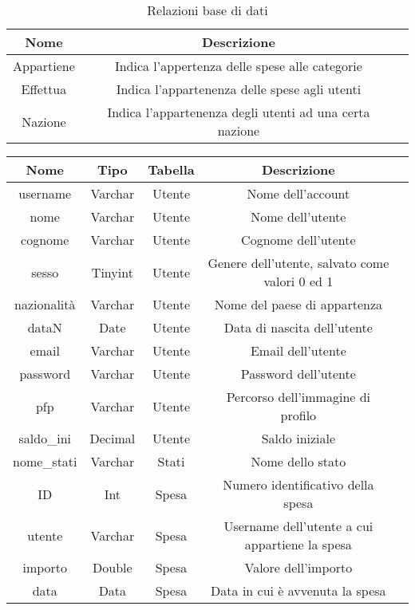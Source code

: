 \documentclass[binding=0.6cm, oneside, noexaminfo, italian]{sapthesis}
\begin{document}
\begin{table}[h]
    \centering
    \begin{tabularx}{\linewidth}{ccX}
        \toprule
        Nome & Descrizione \\
        \midrule
        Appartiene & Indica l'appertenza delle spese alle categorie\\
        Effettua & Indica l'appartenenza delle spese agli utenti\\
        Nazione & Indica l'appartenenza degli utenti ad una certa nazione \\
        \bottomrule
    \end{tabularx}
    \caption{Relazioni base di dati}
    \label{tab:relazioni}
\end{table}
\begin{table}[!ht]
    \centering
    \begin{tabularx}{\linewidth}{ccccX}
        \toprule
        Nome & Tipo & Tabella & Descrizione \\
        \midrule
        username & Varchar & Utente & Nome dell'account \\
        nome & Varchar & Utente & Nome dell'utente \\
        cognome & Varchar & Utente & Cognome dell'utente \\
        sesso & Tinyint & Utente & Genere dell'utente, salvato come valori 0 ed 1 \\
        nazionalità & Varchar & Utente & Nome del paese di appartenza\\
        dataN & Date & Utente & Data di nascita dell'utente \\
        email & Varchar & Utente & Email dell'utente \\
        password & Varchar & Utente & Password dell'utente \\
        pfp & Varchar & Utente & Percorso dell'immagine di profilo \\
        saldo\_ini & Decimal & Utente & Saldo iniziale \\
        nome\_stati & Varchar & Stati & Nome dello stato \\
        ID & Int & Spesa & Numero identificativo della spesa \\
        utente & Varchar & Spesa & Username dell'utente a cui appartiene la spesa\\
        importo & Double & Spesa & Valore dell'importo \\
        data & Data & Spesa & Data in cui è avvenuta la spesa \\

\end{tabularx}
\end{table}
\end{document}

